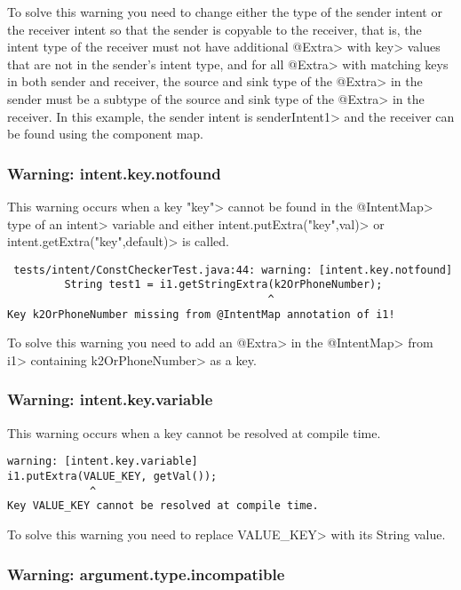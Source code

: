 To solve this warning you need to change either the type of the sender intent
or the receiver intent so that the sender is copyable to the receiver, that is,
the intent type of the receiver must not have additional \<@Extra> with \<key>
values that are not in the sender's intent type, and for all \<@Extra> with
matching keys in both sender and receiver, the source and sink type of the
\<@Extra> in the sender must be a subtype of the source and sink type of
the \<@Extra> in the receiver. In this example, the sender intent is
\<senderIntent1> and the receiver can be found using the component map.

\subsubsection{Warning: intent.key.notfound}
This warning occurs when a key \<"key"> cannot be found in the \<@IntentMap>
type of an \<intent> variable and either \<intent.putExtra("key",val)> or
\<intent.getExtra("key",default)> is called.

\begin{Verbatim}
 tests/intent/ConstCheckerTest.java:44: warning: [intent.key.notfound] 
         String test1 = i1.getStringExtra(k2OrPhoneNumber);
                                         ^
Key k2OrPhoneNumber missing from @IntentMap annotation of i1!
\end{Verbatim}

To solve this warning you need to add an \<@Extra> in the \<@IntentMap> from
\<i1> containing \<k2OrPhoneNumber> as a key.

\subsubsection{Warning: intent.key.variable}
This warning occurs when a key cannot be resolved at compile time.

\begin{Verbatim}
warning: [intent.key.variable] 
i1.putExtra(VALUE_KEY, getVal());
             ^
Key VALUE_KEY cannot be resolved at compile time.
\end{Verbatim}

To solve this warning you need to replace \<VALUE\_KEY> with its
String value.


\subsubsection{Warning: argument.type.incompatible}

